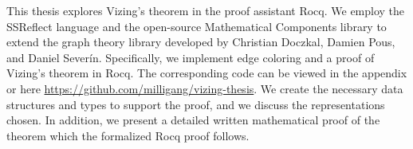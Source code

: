 This thesis explores Vizing's theorem in the proof assistant Rocq. We employ the SSReflect language and the open-source Mathematical Components library to extend the graph theory library developed by Christian Doczkal, Damien Pous, and Daniel Severín. Specifically, we implement edge coloring and a proof of Vizing's theorem in Rocq. The corresponding code can be viewed in the appendix or here \url{https://github.com/milligang/vizing-thesis}. We create the necessary data structures and types to support the proof, and we discuss the representations chosen. In addition, we present a detailed written mathematical proof of the theorem which the formalized Rocq proof follows. 
